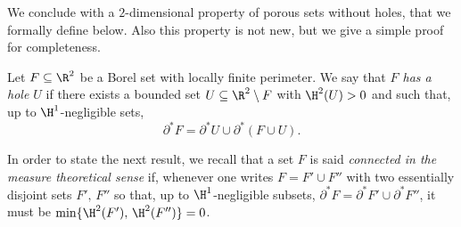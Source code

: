 We conclude with a $2$-dimensional property of porous sets without holes, that we formally define below. Also this property is not new, but we give a simple proof for completeness.

\begin{defn}[Holes]\label{defholes}
Let $F\subseteq\R^2$ be a Borel set with locally finite perimeter. We say that \emph{$F$ has a hole $U$} if there exists a bounded set $U\subseteq \R^2\setminus F$ with $\H^2(U)>0$ and such that, up to $\H^1$-negligible sets,
\[
\partial^* F = \partial^* U \cup \partial^* (F\cup U).
\]
\end{defn}

In order to state the next result, we recall that a set $F$ is said \emph{connected in the measure theoretical sense} if, whenever one writes $F=F'\cup F''$ with two essentially disjoint sets $F',\, F''$ so that, up to $\H^1$-negligible subsets, $\partial^* F = \partial^* F' \cup \partial^* F''$, it must be $\min \{ \H^2(F'),\,\H^2(F'')\}=0$.

